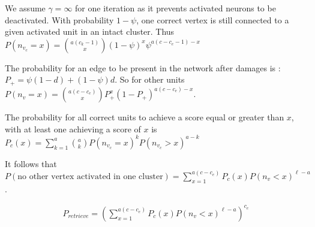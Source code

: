 \documentclass[english,10pt,twocolumn]{IEEEtran}
\renewcommand{\ge}{\geqslant}
\theoremstyle{definition}
\begin{document}
	We assume $\gamma = \infty$ for one iteration as it prevents activated neurons to be deactivated.
	With probability $1 - \psi$, one correct vertex is still connected to a given activated unit in an intact cluster. Thus $P(n_{v_c} = x ) = {a (c_k-1) \choose x} (1-\psi)^{x} \psi ^ { a (c - c_e -1) - x }$	
	
	
	The probability for an edge to be present in the network after damages is : $P_+ = \psi (1 - d) + (1 - \psi) d$. So for other units $P(n_v = x) = {a (c - c_e) \choose x} P_+^x (1-P_+)^{a (c - c_e) -x }$.
	
%	
	
	
	The probability for all correct units to achieve a score equal or greater than $x$, with at least one achieving a score of $x$ is $P_c (x) =\sum_{k = 1}^{a} { a \choose k }   P(n_{v_c} = x)^k P(n_{v_c} > x)^{a-k} $

	It follows that $P(\mbox{no other vertex activated in one cluster})= \sum_{x = 1}^{a (c - c_e)} P_c(x) P(n_v < x)^{\ell-a}$.%
	

	\begin{align}
	P_{retrieve}=  \left( \sum_{x = 1}^{a ( c- c_e)} P_c(x) P(n_v < x)^{\ell-a} \right )^{c_e}
	\label{psi_formula_th}
	\end{align}
\end{document}
